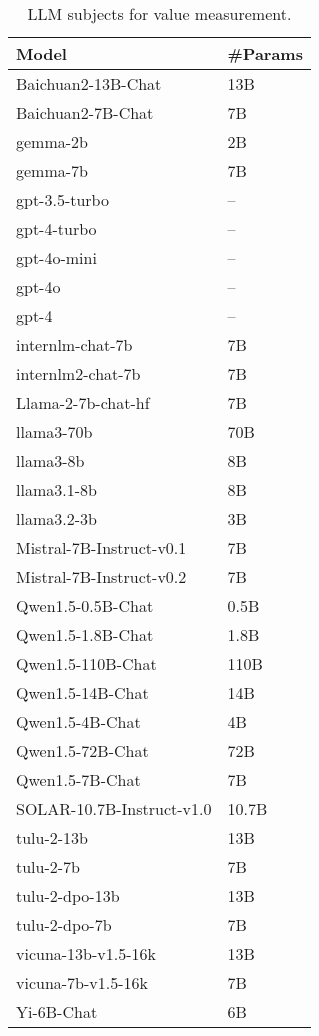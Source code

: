 \begin{table}[h]
    \centering
    \begin{tabular}{ll}
    \toprule
    Model & \#Params \\
    \midrule
    Baichuan2-13B-Chat & 13B \\
    Baichuan2-7B-Chat & 7B \\
    gemma-2b & 2B \\
    gemma-7b & 7B \\
    gpt-3.5-turbo & -- \\
    gpt-4-turbo & -- \\
    gpt-4o-mini & -- \\
    gpt-4o & -- \\
    gpt-4 & -- \\
    internlm-chat-7b & 7B \\
    internlm2-chat-7b & 7B \\
    Llama-2-7b-chat-hf & 7B \\
    llama3-70b & 70B \\
    llama3-8b & 8B \\
    llama3.1-8b & 8B \\
    llama3.2-3b & 3B \\
    Mistral-7B-Instruct-v0.1 & 7B \\
    Mistral-7B-Instruct-v0.2 & 7B \\
    Qwen1.5-0.5B-Chat & 0.5B \\
    Qwen1.5-1.8B-Chat & 1.8B \\
    Qwen1.5-110B-Chat & 110B \\
    Qwen1.5-14B-Chat & 14B \\
    Qwen1.5-4B-Chat & 4B \\
    Qwen1.5-72B-Chat & 72B \\
    Qwen1.5-7B-Chat & 7B \\
    SOLAR-10.7B-Instruct-v1.0 & 10.7B \\
    tulu-2-13b & 13B \\
    tulu-2-7b & 7B \\
    tulu-2-dpo-13b & 13B \\
    tulu-2-dpo-7b & 7B \\
    vicuna-13b-v1.5-16k & 13B \\
    vicuna-7b-v1.5-16k & 7B \\
    Yi-6B-Chat & 6B \\
    \bottomrule
    \end{tabular}
    \caption{LLM subjects for value measurement.}
    \label{tab:llm_subjects}
    \end{table}

